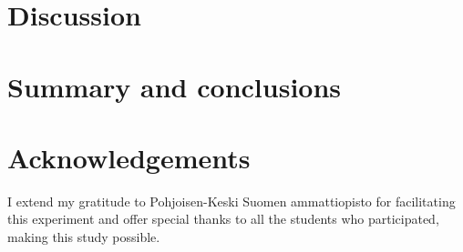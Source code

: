 \documentclass[final,5p,times,twocolumn,authoryear]{elsarticle}
\begin{document}
\section{Discussion}

\section{Summary and conclusions}


\section*{Acknowledgements}
I extend my gratitude to Pohjoisen-Keski Suomen ammattiopisto for facilitating this experiment and offer special thanks to all the students who participated, making this study possible.


 







\end{document}
